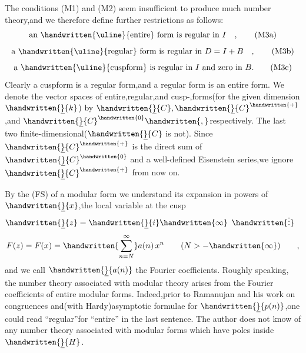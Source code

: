 The conditions (M1) and (M2) seem insufficient to produce much number theory,and we therefore define further restrictions as follows:
\[
\text{an \handwritten{\uline}{entire} form is regular in } I\quad ,
\tag*{(M3a)}
\]
\[
\text{a \handwritten{\uline}{regular} form is regular in } D=I+B\quad ,
\tag*{(M3b)}
\]
\[
\text{a \handwritten{\uline}{cuspform} is regular in } I \text{ and zero in } B.
\tag*{(M3c)}
\]
Clearly a cuspform is a regular form,and a regular form is an entire form. We denote the vector spaces of entire,regular,and cusp-,forms(for the given dimension $\handwritten{\underline}{k}$) by $\handwritten{\underline}{C},\handwritten{\underline}{C}^{\handwritten{+}}$,and $\handwritten{\underline}{C}^{\handwritten{0}}\handwritten{,}$respectively. The last two  finite-dimensional($\handwritten{\underline}{C}$ is not). Since $\handwritten{\underline}{C}^{\handwritten{+}}$ is the direct sum of $\handwritten{\underline}{C}^{\handwritten{0}}$ and a well-defined Eisenstein series,we ignore $\handwritten{\underline}{C}^{\handwritten{+}}$ from now on.

By the   (FS)\unsure{-} of a modular form we understand its expansion in powers of $\handwritten{\underline}{x}$,the local variable at the cusp $\handwritten{\underline}{z}=\handwritten{\underline}{i}\handwritten{\infty}$ $\handwritten{\vdots}$
\[
F(z)=F(x)=\handwritten{\sum_{n=N}^{\infty}}a(n)\,x^{n}\qquad (N>-\handwritten{\infty})\qquad ,
\]
and we call \reversemarginpar{}\normalmarginpar $\handwritten{\underline}{a(n)}$ the Fourier coefficients. Roughly speaking, the number theory associated with modular theory arises from the Fourier coefficients of entire modular forms. Indeed,prior to Ramanujan and his work on congruences and(with Hardy)asymptotic formulae for $\handwritten{\underline}{p(n)}$,one could read ``regular''for ``entire'' in the last sentence. The author does not know of any number theory associated with modular forms which have poles inside $\handwritten{\underline}{H}$.
\endgroup

